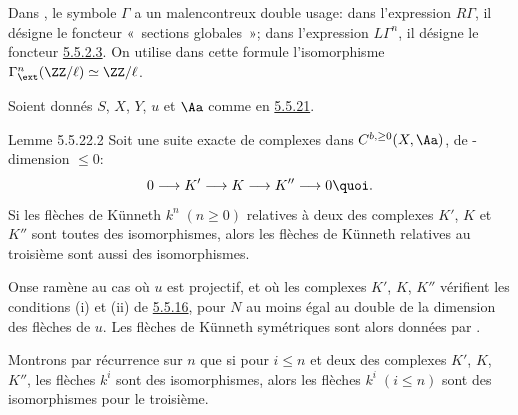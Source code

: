 Dans , le symbole $\Gamma$ a un malencontreux
double usage:
dans l'expression $R\Gamma$, il désigne le foncteur « sections
globales »; dans l'expression $L\Gamma^{n}$, il désigne le foncteur
\hyperref[XVII.par5.5.2.3]{5.5.2.3}. On utilise dans cette formule l'isomorphisme
$\Gamma^{n}_{\ext}(\ZZ/\ell)\simeq \ZZ/\ell$.

Soient donnés $S$, $X$, $Y$, $u$ et $\Aa$ comme en \hyperref[XVII.thm5.5.21]{5.5.21}.

\begin{enonce*}{Lemme 5.5.22.2}
Soit une suite exacte de complexes dans $C^{b,\geq 0}(X,\Aa)$,
de \ttor-dimension $\leq 0$:
$$
0\longrightarrow K'\longrightarrow K\longrightarrow K''\longrightarrow
0{\quoi}.
$$
Si les flèches de K\"unneth $k^{n}\;(n\geq 0)$ relatives à deux des
complexes $K'$, $K$ et $K''$ sont toutes des isomorphismes, alors les
flèches de K\"unneth relatives au troisième sont aussi des isomorphismes.
\end{enonce*}

On\pageoriginale se ramène au cas où $u$ est projectif, et où les
complexes $K'$, $K$, $K''$ vérifient les conditions (i) et (ii) de
\hyperref[XVII.lem5.5.16]{5.5.16}, pour $N$ au moins égal au double de la dimension des flèches
de $u$. Les flèches de Künneth symétriques sont alors données par
.

Montrons par récurrence sur $n$ que si pour $i\leq n$ et deux des
complexes $K'$, $K$, $K''$, les flèches $k^{i}$ sont des
isomorphismes, alors les flèches $k^{i}\;(i\leq n)$ sont des
isomorphismes pour le troisième.

